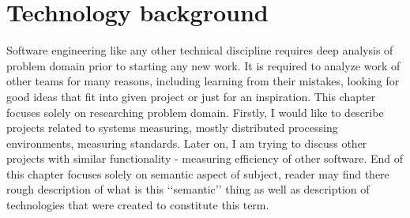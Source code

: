 %

\chapter{Technology background}
\label{cha:background}

\parbox{0.8\textwidth}{

{\small
Software engineering like any other technical discipline requires deep analysis of problem domain prior to starting any new work. It is required to analyze work of other teams for many reasons, including learning from their mistakes, looking for good ideas that fit into given project or just for an inspiration. This chapter focuses solely on researching problem domain. Firstly, I would like to describe projects related to systems measuring, mostly distributed processing environments, measuring standards. Later on, I am trying to discuss other projects with similar functionality - measuring efficiency of other software. End of this chapter focuses solely on semantic aspect of subject, reader may find there rough description of what is this \lq\lq{}semantic\rq\rq{} thing as well as description of technologies that were created to constitute this term.

}
}




